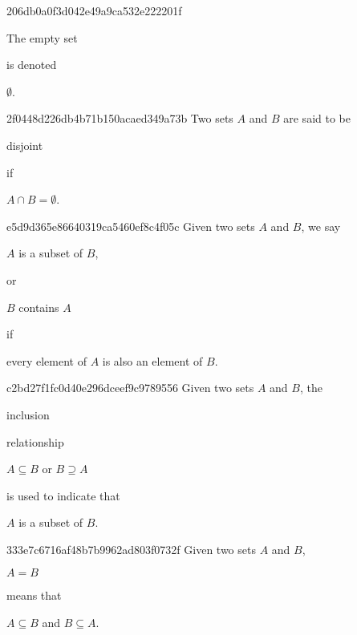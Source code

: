 \begin{note}{206db0a0f3d042e49a9ca532e222201f}
    \begin{icloze}{2}The empty set\end{icloze} is denoted \begin{icloze}{1}\({ \emptyset }\).\end{icloze}
\end{note}

\begin{note}{2f0448d226db4b71b150acaed349a73b}
    Two sets \({ A }\) and \({ B }\) are said to be \begin{icloze}{2}disjoint\end{icloze} if \begin{icloze}{1}\({ A \cap B = \emptyset }\).\end{icloze}
\end{note}

\begin{note}{e5d9d365e86640319ca5460ef8c4f05c}
    Given two sets \({ A }\) and \({ B }\), we say \begin{icloze}{2}\({ A }\) is a subset of \({ B }\),\end{icloze} or \begin{icloze}{2}\({ B }\) contains \({ A }\)\end{icloze} if \begin{icloze}{1}every element of \({ A }\) is also an element of \({ B }\).\end{icloze}
\end{note}

\begin{note}{c2bd27f1fc0d40e296dceef9c9789556}
    Given two sets \({ A }\) and \({ B }\), the \begin{icloze}{3}inclusion\end{icloze} relationship \begin{icloze}{2}\({ A \subseteq B }\) or \({ B \supseteq A }\)\end{icloze} is used to indicate that \begin{icloze}{1}\({ A }\) is a subset of \({ B }\).\end{icloze}
\end{note}

\begin{note}{333e7c6716af48b7b9962ad803f0732f}
    Given two sets \({ A }\) and \({ B }\), \begin{icloze}{2}\({ A = B }\)\end{icloze} means that \begin{icloze}{1}\({ A \subseteq B }\) and \({ B \subseteq A }\).\end{icloze}
\end{note}

